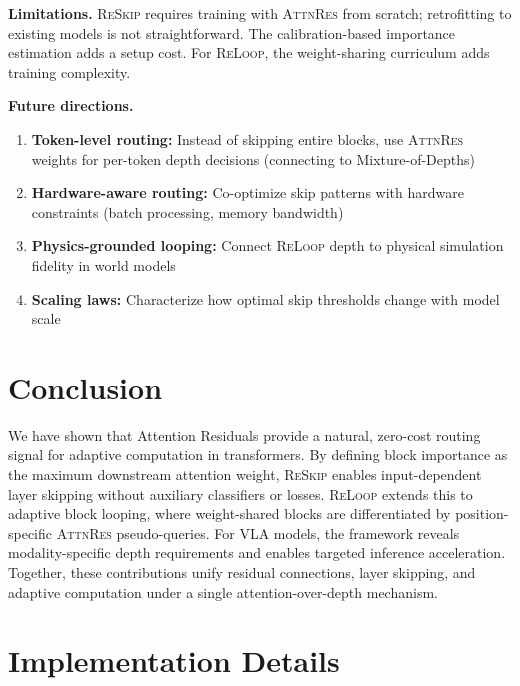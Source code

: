 \documentclass{article}
\newcommand{\attnres}{\textsc{AttnRes}}
\newcommand{\reskip}{\textsc{ReSkip}}
\newcommand{\reloop}{\textsc{ReLoop}}
\begin{document}
\textbf{Limitations.} \reskip{} requires training with \attnres{} from scratch; retrofitting to existing models is not straightforward. The calibration-based importance estimation adds a setup cost. For \reloop{}, the weight-sharing curriculum adds training complexity.

\textbf{Future directions.}
\begin{enumerate}
    \item \textbf{Token-level routing:} Instead of skipping entire blocks, use \attnres{} weights for per-token depth decisions (connecting to Mixture-of-Depths)
    \item \textbf{Hardware-aware routing:} Co-optimize skip patterns with hardware constraints (batch processing, memory bandwidth)
    \item \textbf{Physics-grounded looping:} Connect \reloop{} depth to physical simulation fidelity in world models
    \item \textbf{Scaling laws:} Characterize how optimal skip thresholds change with model scale
\end{enumerate}

\section{Conclusion}
\label{sec:conclusion}

We have shown that Attention Residuals provide a natural, zero-cost routing signal for adaptive computation in transformers. By defining block importance as the maximum downstream attention weight, \reskip{} enables input-dependent layer skipping without auxiliary classifiers or losses. \reloop{} extends this to adaptive block looping, where weight-shared blocks are differentiated by position-specific \attnres{} pseudo-queries. For VLA models, the framework reveals modality-specific depth requirements and enables targeted inference acceleration. Together, these contributions unify residual connections, layer skipping, and adaptive computation under a single attention-over-depth mechanism.




\appendix
\section{Implementation Details}
\label{app:implementation}
\end{document}
